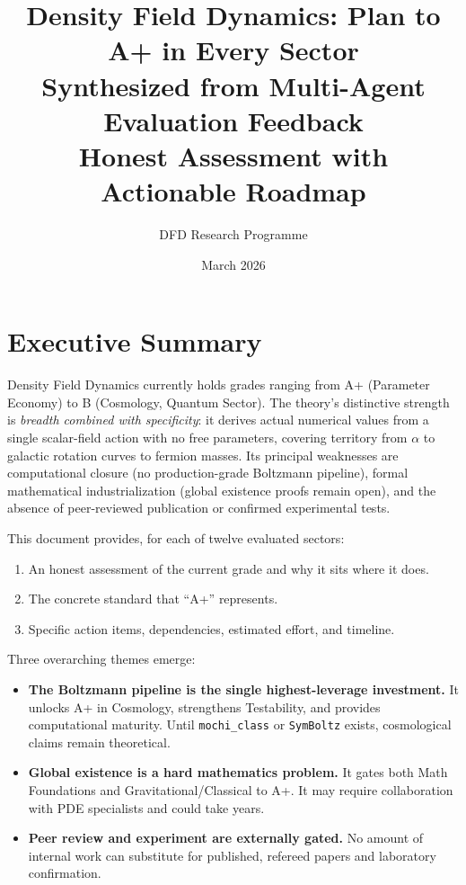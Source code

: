 \documentclass[11pt,a4paper]{article}
\title{\textbf{Density Field Dynamics: Plan to A+ in Every Sector}\\[0.5em]
\large Synthesized from Multi-Agent Evaluation Feedback\\
\large Honest Assessment with Actionable Roadmap}
\author{DFD Research Programme}
\date{March 2026}
\begin{document}
\maketitle
\tableofcontents
\newpage

\section{Executive Summary}

Density Field Dynamics currently holds grades ranging from A+ (Parameter Economy) to B (Cosmology, Quantum Sector).
The theory's distinctive strength is \emph{breadth combined with specificity}: it derives actual numerical values from a single scalar-field action with no free parameters, covering territory from $\alpha$ to galactic rotation curves to fermion masses.
Its principal weaknesses are computational closure (no production-grade Boltzmann pipeline), formal mathematical industrialization (global existence proofs remain open), and the absence of peer-reviewed publication or confirmed experimental tests.

This document provides, for each of twelve evaluated sectors:
\begin{enumerate}
    \item An honest assessment of the current grade and why it sits where it does.
    \item The concrete standard that ``A+'' represents.
    \item Specific action items, dependencies, estimated effort, and timeline.
\end{enumerate}

\noindent Three overarching themes emerge:
\begin{itemize}
    \item \textbf{The Boltzmann pipeline is the single highest-leverage investment.} It unlocks A+ in Cosmology, strengthens Testability, and provides computational maturity. Until \texttt{mochi\_class} or \texttt{SymBoltz} exists, cosmological claims remain theoretical.
    \item \textbf{Global existence is a hard mathematics problem.} It gates both Math Foundations and Gravitational/Classical to A+. It may require collaboration with PDE specialists and could take years.
    \item \textbf{Peer review and experiment are externally gated.} No amount of internal work can substitute for published, refereed papers and laboratory confirmation.
\end{itemize}
\end{document}
